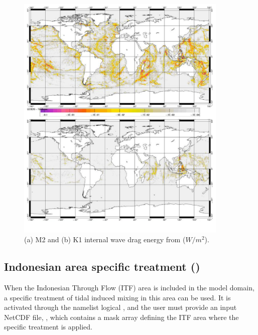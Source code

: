 {%
\begin{figure}[!t] 	\begin{center}
\includegraphics[width=0.90\textwidth]{./TexFiles/Figures/Fig_ZDF_M2_K1_tmx.pdf}
\caption{  \label{Fig_ZDF_M2_K1_tmx} 
(a) M2 and (b) K1 internal wave drag energy from \citet{Carrere_Lyard_GRL03} ($W/m^2$). }
\end{center}  	\end{figure}
 
\subsection{Indonesian area specific treatment ()}
\label{ZDF_tmx_itf}

When the Indonesian Through Flow (ITF) area is included in the model domain,
a specific treatment of tidal induced mixing in this area can be used. 
It is activated through the namelist logical , and the user must provide
an input NetCDF file, , which contains a mask array defining the ITF area
where the specific treatment is applied.

}
